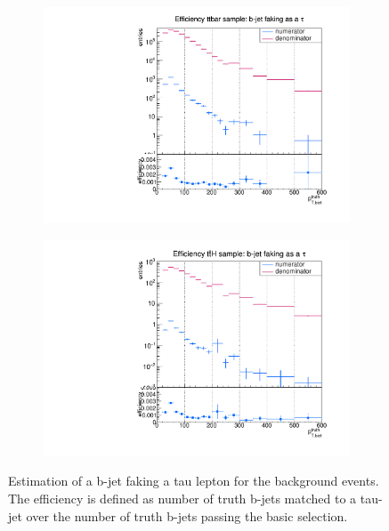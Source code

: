 \begin{figure}
  \centering
                \begin{subfigure}[t]{0.49\textwidth}
                \includegraphics[width=\textwidth]{figures/plots/ttbar/Divided_Bjet.pdf}
                \label{DividedBjet:bg:ttbar}
                \end{subfigure}
                \begin{subfigure}[t]{0.49\textwidth}
                \includegraphics[width=\textwidth]{figures/plots/ttH/Divided_Bjet.pdf}
                \label{DividedBjet:bg:ttH}
                \end{subfigure}
\caption[Estimation of a b-jet faking a tau lepton for the background events.]{Estimation of a b-jet faking a tau lepton for the background events. The efficiency is defined as number of truth b-jets matched to a tau-jet over the number of truth b-jets passing the basic selection.}
\label{DividedBjet:bg}
\end{figure}
